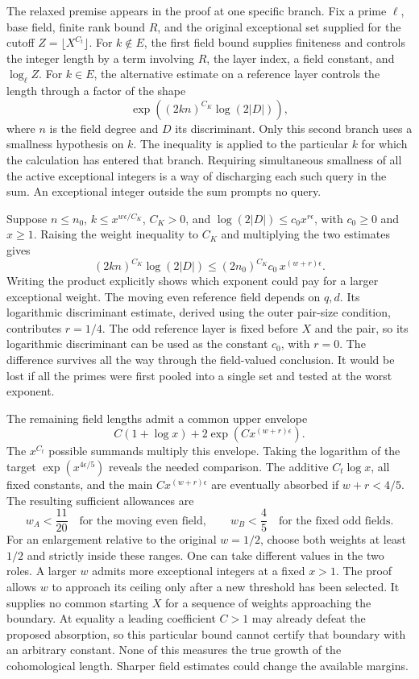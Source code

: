 \documentclass[12pt,letterpaper]{article}
\begin{document}
The relaxed premise appears in the proof at one specific branch. Fix a prime $\ell$, base field, finite rank bound $R$, and the original exceptional set supplied for the cutoff $Z=\lfloor X^{C_t}\rfloor$. For $k\notin E$, the first field bound supplies finiteness and controls the integer length by a term involving $R$, the layer index, a field constant, and $\log_{\ell} Z$. For $k\in E$, the alternative estimate on a reference layer controls the length through a factor of the shape
\[
    \exp\!\left((2kn)^{C_K}\log(2|D|)\right),
\]
where $n$ is the field degree and $D$ its discriminant. Only this second branch uses a smallness hypothesis on $k$. The inequality is applied to the particular $k$ for which the calculation has entered that branch. Requiring simultaneous smallness of all the active exceptional integers is a way of discharging each such query in the sum. An exceptional integer outside the sum prompts no query.

Suppose $n\leq n_0$, $k\leq x^{w\epsilon/C_K}$, $C_K>0$, and $\log(2|D|)\leq c_0 x^{r\epsilon}$, with $c_0\geq0$ and $x\geq1$. Raising the weight inequality to $C_K$ and multiplying the two estimates gives
\[
 (2kn)^{C_K}\log(2|D|)
 \leq (2n_0)^{C_K}c_0\,x^{(w+r)\epsilon}.
\]
Writing the product explicitly shows which exponent could pay for a larger exceptional weight. The moving even reference field depends on $q,d$. Its logarithmic discriminant estimate, derived using the outer pair-size condition, contributes $r=1/4$. The odd reference layer is fixed before $X$ and the pair, so its logarithmic discriminant can be used as the constant $c_0$, with $r=0$. The difference survives all the way through the field-valued conclusion. It would be lost if all the primes were first pooled into a single set and tested at the worst exponent.

The remaining field lengths admit a common upper envelope
\[
      C(1+\log x)+2\exp\!\left(Cx^{(w+r)\epsilon}\right).
\]
The $x^{C_t}$ possible summands multiply this envelope. Taking the logarithm of the target $\exp(x^{4\epsilon/5})$ reveals the needed comparison. The additive $C_t\log x$, all fixed constants, and the main $Cx^{(w+r)\epsilon}$ are eventually absorbed if $w+r<4/5$. The resulting sufficient allowances are
\[
   w_A<\frac{11}{20}\quad\text{for the moving even field},
   \qquad
   w_B<\frac45\quad\text{for the fixed odd fields}.
\]
For an enlargement relative to the original $w=1/2$, choose both weights at least $1/2$ and strictly inside these ranges. One can take different values in the two roles. A larger $w$ admits more exceptional integers at a fixed $x>1$. The proof allows $w$ to approach its ceiling only after a new threshold has been selected. It supplies no common starting $X$ for a sequence of weights approaching the boundary. At equality a leading coefficient $C>1$ may already defeat the proposed absorption, so this particular bound cannot certify that boundary with an arbitrary constant. None of this measures the true growth of the cohomological length. Sharper field estimates could change the available margins.
\end{document}
